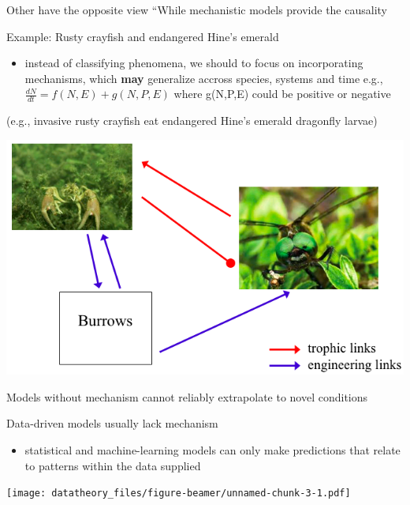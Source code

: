 \documentclass[
  ignorenonframetext,
]{beamer}
\providecommand{\tightlist}{%
  \setlength{\itemsep}{0pt}\setlength{\parskip}{0pt}}
\begin{document}
\begin{frame}{Other have the opposite view}
\protect\hypertarget{other-have-the-opposite-view}{}
``While mechanistic models provide the causality

\begin{block}{Example: Rusty crayfish and endangered Hine's emerald}
\protect\hypertarget{example-rusty-crayfish-and-endangered-hines-emerald}{}
\begin{itemize}
\tightlist
\item
  instead of classifying phenomena, we should to focus on incorporating
  mechanisms, which \textbf{may} generalize accross species, systems and
  time e.g., \(\frac{dN}{dt}=f(N,E)+g(N,P,E)\) where g(N,P,E) could be
  positive or negative
\end{itemize}

(e.g., invasive rusty crayfish eat endangered Hine's emerald dragonfly
larvae)

\begin{center}\includegraphics[width=0.5\linewidth]{hinescrayfish} \end{center}
\end{block}

\begin{block}{Models without mechanism cannot reliably extrapolate to
novel conditions}
\protect\hypertarget{models-without-mechanism-cannot-reliably-extrapolate-to-novel-conditions}{}
\end{block}

\begin{block}{Data-driven models usually lack mechanism}
\protect\hypertarget{data-driven-models-usually-lack-mechanism}{}
\begin{itemize}
\tightlist
\item
  statistical and machine-learning models can only make predictions that
  relate to patterns within the data supplied
\end{itemize}

\texttt{[image: datatheory\_files/figure-beamer/unnamed-chunk-3-1.pdf]}
\end{block}
\end{frame}
\end{document}

